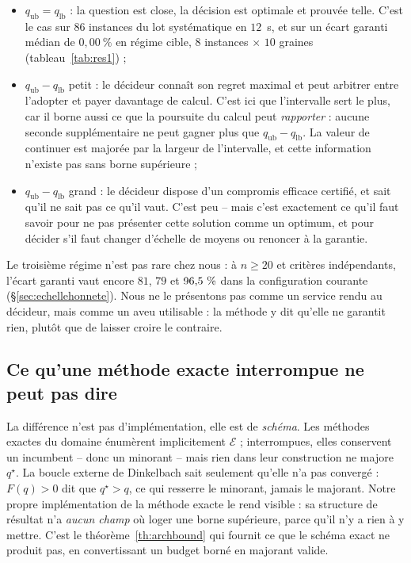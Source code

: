 \documentclass[11pt,a4paper]{article}
\theoremstyle{plain}
\theoremstyle{remark}
\newcommand{\Ecal}{\mathcal{E}}
\newcommand{\qs}{q^{\star}}
\begin{document}
\begin{itemize}[leftmargin=*,itemsep=3pt]
\item $q_{\text{ub}}=q_{\text{lb}}$ : la question est close, la décision est
      optimale et prouvée telle. C'est le cas sur $86$ instances du
      lot systématique en $12$~s, et sur un écart garanti médian de $0{,}00\ \%$ en régime cible, $8$ instances $\times$ $10$ graines (tableau~\ref{tab:res1}) ;
\item $q_{\text{ub}}-q_{\text{lb}}$ petit : le décideur connaît son regret
      maximal et peut arbitrer entre l'adopter et payer davantage de calcul.
      C'est ici que l'intervalle sert le plus, car il borne aussi ce que la
      poursuite du calcul peut \emph{rapporter} : aucune seconde
      supplémentaire ne peut gagner plus que $q_{\text{ub}}-q_{\text{lb}}$.
      La valeur de continuer est majorée par la largeur de l'intervalle,
      et cette information n'existe pas sans borne supérieure ;
\item $q_{\text{ub}}-q_{\text{lb}}$ grand : le décideur dispose d'un
      compromis efficace certifié, et sait qu'il ne sait pas ce qu'il vaut.
      C'est peu -- mais c'est exactement ce qu'il faut savoir pour ne pas
      présenter cette solution comme un optimum, et pour décider s'il faut
      changer d'échelle de moyens ou renoncer à la garantie.
\end{itemize}

\noindent
Le troisième régime n'est pas rare chez nous : à $n\ge 20$ et critères
indépendants, l'écart garanti vaut encore $81$, $79$ et $96{,}5{}\ \%$ dans la
configuration courante (§\ref{sec:echellehonnete}). Nous ne le présentons pas
comme un service rendu au décideur, mais comme un aveu utilisable : la
méthode y dit qu'elle ne garantit rien, plutôt que de laisser croire le
contraire.

\subsection{Ce qu'une méthode exacte interrompue ne peut pas dire}

La différence n'est pas d'implémentation, elle est de \emph{schéma}. Les
méthodes exactes du domaine énumèrent implicitement $\Ecal$ ; interrompues,
elles conservent un incumbent -- donc un minorant -- mais rien dans leur
construction ne majore $\qs$. La boucle externe de Dinkelbach sait seulement
qu'elle n'a pas convergé : $F(q)>0$ dit que $\qs>q$, ce qui resserre le
minorant, jamais le majorant. Notre propre implémentation de la méthode
exacte le rend visible : sa structure de résultat n'a \emph{aucun champ} où
loger une borne supérieure, parce qu'il n'y a rien à y mettre. C'est le
théorème~\ref{th:archbound} qui fournit ce que le schéma exact ne produit pas, en
convertissant un budget borné en majorant valide.
\end{document}
